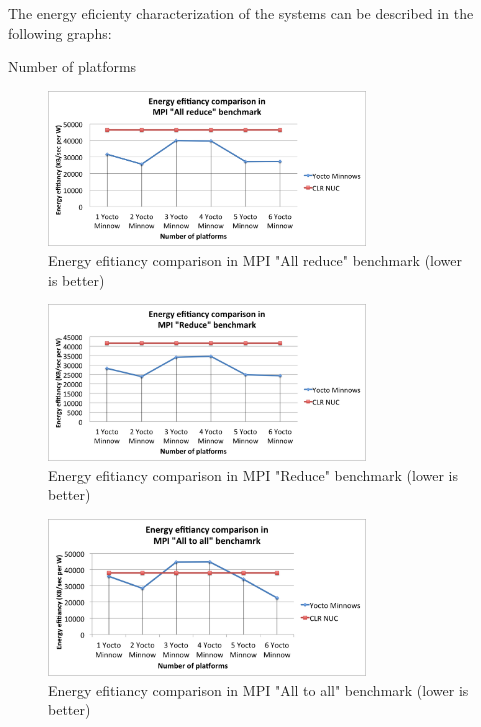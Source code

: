 The energy eficienty characterization of the systems can be described in the
following graphs: 

Number of platforms

\begin{figure}[H]
\centering
\includegraphics[width=0.75\textwidth]{images/energy_results/allreduce.png}
\caption{Energy efitiancy comparison in MPI "All reduce" benchmark (lower is
better)}
\label{all_reduce_energy}
\end{figure}


\begin{figure}[H]
\centering
\includegraphics[width=0.75\textwidth]{images/energy_results/reduce.png}
\caption{Energy efitiancy comparison in MPI "Reduce" benchmark (lower is
better)}
\label{reduce_energy}
\end{figure}


\begin{figure}[H]
\centering
\includegraphics[width=0.75\textwidth]{images/energy_results/all_to_all.png}
\caption{Energy efitiancy comparison in MPI "All to all" benchmark (lower is
better)}
\label{alltoall_energy}
\end{figure}


